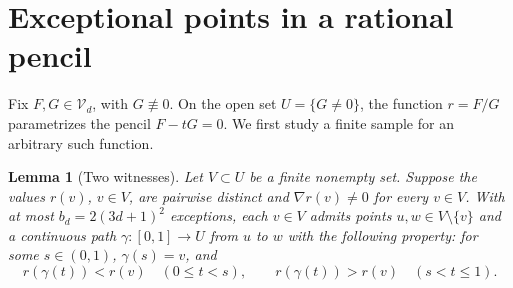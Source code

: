 \documentclass[11pt,letterpaper]{article}
\newcommand{\Vd}{\mathcal V_d}
\newtheorem{lemma}[theorem]{Lemma}
\begin{document}
\section{Exceptional points in a rational pencil}
Fix $F,G\in\Vd$, with $G\not\equiv0$. On the open set $U=\{G\neq0\}$, the function $r=F/G$ parametrizes the pencil $F-tG=0$. We first study a finite sample for an arbitrary such function.
\begin{lemma}[Two witnesses]\label{lem:witnesses}
Let $V\subset U$ be a finite nonempty set. Suppose the values $r(v)$, $v\in V$, are pairwise distinct and $\nabla r(v)\neq0$ for every $v\in V$. With at most $b_d=2(3d+1)^2$ exceptions, each $v\in V$ admits points $u,w\in V\setminus\{v\}$ and a continuous path $\gamma:[0,1]\to U$ from $u$ to $w$ with the following property: for some $s\in(0,1)$, $\gamma(s)=v$, and
\[
r(\gamma(t))<r(v)\quad(0\leq t<s),\qquad
r(\gamma(t))>r(v)\quad(s<t\leq1).
\]
\end{lemma}
\end{document}
